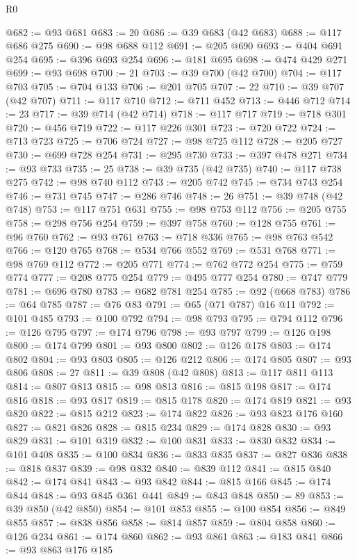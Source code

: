\begin{lexlean}{R0}
\begin{coremodule}
@682 := @93 @681
@683 := 20
@686 := @39 @683 (@42 @683)
@688 := @117 @686 @275
@690 := @98 @688 @112
@691 := @205 @690
@693 := @404 @691 @254
@695 := @396 @693 @254
@696 := @181 @695
@698 := @474 @429 @271
@699 := @93 @698
@700 := 21
@703 := @39 @700 (@42 @700)
@704 := @117 @703
@705 := @704 @133
@706 := @201 @705
@707 := 22
@710 := @39 @707 (@42 @707)
@711 := @117 @710
@712 := @711 @452
@713 := @446 @712
@714 := 23
@717 := @39 @714 (@42 @714)
@718 := @117 @717
@719 := @718 @301
@720 := @456 @719
@722 := @117 @226 @301
@723 := @720 @722
@724 := @713 @723
@725 := @706 @724
@727 := @98 @725 @112
@728 := @205 @727
@730 := @699 @728 @254
@731 := @295 @730
@733 := @397 @478 @271
@734 := @93 @733
@735 := 25
@738 := @39 @735 (@42 @735)
@740 := @117 @738 @275
@742 := @98 @740 @112
@743 := @205 @742
@745 := @734 @743 @254
@746 := @731 @745
@747 := @286 @746
@748 := 26
@751 := @39 @748 (@42 @748)
@753 := @117 @751 @631
@755 := @98 @753 @112
@756 := @205 @755
@758 := @298 @756 @254
@759 := @397 @758
@760 := @128 @755
@761 := @96 @760
@762 := @93 @761
@763 := @718 @336
@765 := @98 @763 @542
@766 := @120 @765
@768 := @534 @766 @552
@769 := @531 @768
@771 := @98 @769 @112
@772 := @205 @771
@774 := @762 @772 @254
@775 := @759 @774
@777 := @208 @775 @254
@779 := @495 @777 @254
@780 := @747 @779
@781 := @696 @780
@783 := @682 @781 @254
@785 := @92 (@668 @783)
@786 := @64 @785
@787 := @76 @83
@791 := @65 (@71 @787) @16 @11
@792 := @101 @485
@793 := @100 @792
@794 := @98 @793
@795 := @794 @112
@796 := @126 @795
@797 := @174 @796
@798 := @93 @797
@799 := @126 @198
@800 := @174 @799
@801 := @93 @800
@802 := @126 @178
@803 := @174 @802
@804 := @93 @803
@805 := @126 @212
@806 := @174 @805
@807 := @93 @806
@808 := 27
@811 := @39 @808 (@42 @808)
@813 := @117 @811 @113
@814 := @807 @813
@815 := @98 @813
@816 := @815 @198
@817 := @174 @816
@818 := @93 @817
@819 := @815 @178
@820 := @174 @819
@821 := @93 @820
@822 := @815 @212
@823 := @174 @822
@826 := @93 @823 @176 @160
@827 := @821 @826
@828 := @815 @234
@829 := @174 @828
@830 := @93 @829
@831 := @101 @319
@832 := @100 @831
@833 := @830 @832
@834 := @101 @408
@835 := @100 @834
@836 := @833 @835
@837 := @827 @836
@838 := @818 @837
@839 := @98 @832
@840 := @839 @112
@841 := @815 @840
@842 := @174 @841
@843 := @93 @842
@844 := @815 @166
@845 := @174 @844
@848 := @93 @845 @361 @441
@849 := @843 @848
@850 := 89
@853 := @39 @850 (@42 @850)
@854 := @101 @853
@855 := @100 @854
@856 := @849 @855
@857 := @838 @856
@858 := @814 @857
@859 := @804 @858
@860 := @126 @234
@861 := @174 @860
@862 := @93 @861
@863 := @183 @841
@866 := @93 @863 @176 @185

\end{coremodule}
\end{lexlean}
